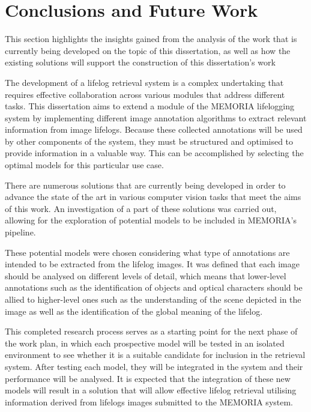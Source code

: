 

\chapter{Conclusions and Future Work}
\label{chapter:conclusion}

\begin{introduction}
This section highlights the insights gained from the analysis of the work that is currently being developed on the topic of this dissertation, as well as how the existing solutions will support the construction of this dissertation's work
\end{introduction}

The development of a lifelog retrieval system is a complex undertaking that requires effective collaboration across various modules that address different tasks. This dissertation aims to extend a module of the MEMORIA lifelogging system by implementing different image annotation algorithms to extract relevant information from image lifelogs. Because these collected annotations will be used by other components of the system, they must be structured and optimised to provide information in a valuable way. This can be accomplished by selecting the optimal models for this particular use case.

There are numerous solutions that are currently being developed in order to advance the state of the art in various computer vision tasks that meet the aims of this work. An investigation of a part of these solutions was carried out, allowing for the exploration of potential models to be included in MEMORIA's pipeline. 

These potential models were chosen considering what type of annotations are intended to be extracted from the lifelog images. It was defined that each image should be analysed on different levels of detail, which means that lower-level annotations such as the identification of objects and optical characters should be allied to higher-level ones such as the understanding of the scene depicted in the image as well as the identification of the global meaning of the lifelog.

This completed research process serves as a starting point for the next phase of the work plan, in which each prospective model will be tested in an isolated environment to see whether it is a suitable candidate for inclusion in the retrieval system. After testing each model, they will be integrated in the system and their performance will be analysed. It is expected that the integration of these new models will result in a solution that will allow effective lifelog retrieval utilising information derived from lifelogs images submitted to the MEMORIA system.






